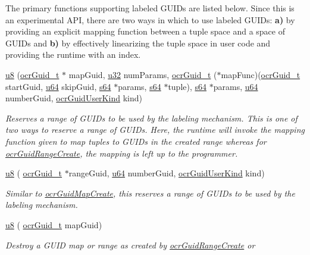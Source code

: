 The primary functions supporting labeled GUIDs are listed below. Since
this is an experimental API, there are two ways in which to use
labeled GUIDs: {\bf a)} by providing an explicit mapping function
between a tuple space and a space of GUIDs and {\bf b)} by effectively
linearizing the tuple space in user code and providing the runtime
with an index.
\begin{DoxyCompactItemize}
\item
  \hyperlink{type_u8}{u8} \hyperlink{func_ocrGuidMapCreate}
  {}(\hyperlink{type_ocrGuid_t}{ocr\-Guid\-\_\-t}
  $\ast$ mapGuid,
  \hyperlink{type_u32}{u32} numParams,
  \hyperlink{type_ocrGuid_t}{ocr\-Guid\-\_\-t}
  ($\ast$mapFunc)(\hyperlink{type_ocrGuid_t}{ocr\-Guid\-\_\-t}
  startGuid, \hyperlink{type_u64}{u64} skipGuid,
  \hyperlink{type_s64}{s64} $\ast$params, \hyperlink{type_s64}{s64}
  $\ast$tuple), \hyperlink{type_s64}{s64} $\ast$params,
  \hyperlink{type_u64}{u64} numberGuid,
  \hyperlink{type_ocrGuidUserKind}{ocrGuidUserKind} kind)
  \begin{DoxyCompactList}
    \small \item \emph{Reserves a range of GUIDs to be used by the
      labeling mechanism. This is one of two ways to reserve a range
      of GUIDs. Here, the runtime will invoke the mapping function
      given to map tuples to GUIDs in the created range whereas for
      \hyperlink{func_ocrGuidRangeCreate}{ocrGuidRangeCreate}, the mapping is left up to
      the programmer.}
  \end{DoxyCompactList}
\item
  \hyperlink{type_u8}{u8}
  \hyperlink{func_ocrGuidRangeCreate}{}(
  \hyperlink{type_ocrGuid_t}{ocr\-Guid\-\_\-t} $\ast$rangeGuid,
  \hyperlink{type_u64}{u64} numberGuid,
  \hyperlink{type_ocrGuidUserKind}{ocrGuidUserKind} kind)
  \begin{DoxyCompactList}
    \small \item \emph{Similar to \hyperlink{func_ocrGuidMapCreate}{ocrGuidMapCreate},
      this reserves a range of GUIDs to be used by the labeling
      mechanism.}
  \end{DoxyCompactList}
\item
  \hyperlink{type_u8}{u8}
  \hyperlink{func_ocrGuidMapDestroy}{}(
  \hyperlink{type_ocrGuid_t}{ocr\-Guid\-\_\-t} mapGuid)
  \begin{DoxyCompactList}
    \small \item \emph{Destroy a GUID map or range as created by
      \hyperlink{func_ocrGuidRangeCreate}{ocrGuidRangeCreate} or
}
\end{DoxyCompactList}
\end{DoxyCompactItemize}
